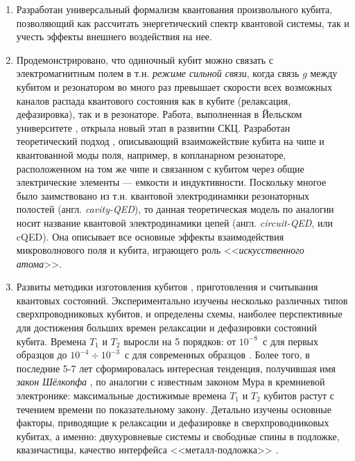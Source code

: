 \begin{enumerate}
	\item Разработан универсальный формализм \cite{devoret1995quantum} квантования произвольного кубита, позволяющий как рассчитать энергетический спектр квантовой системы, так и учесть эффекты внешнего воздействия на нее.
	\item Продемонстрировано, что одиночный кубит можно связать с электромагнитным полем в т.н. \textit{режиме сильной связи}, когда связь $g$ между кубитом и резонатором во много раз превышает скорости всех возможных каналов распада квантового состояния как в кубите (релаксация, дефазировка), так и в резонаторе. Работа, выполненная в Йельском университете \cite{wallraff2004strong}, открыла новый этап в развитии СКЦ. Разработан теоретический подход \cite{blais2004cavity}, описывающий взаиможействие кубита на чипе и квантованной моды поля, например, в копланарном резонаторе, расположенном на том же чипе и связанном с кубитом через общие электрические элементы --- емкости и индуктивности. Поскольку многое было заимствовано из т.н. квантовой электродинамики резонаторных полостей (англ. \textit{cavity-QED}), то данная теоретическая модель по аналогии носит название квантовой электродинамики цепей (англ. \textit{circuit-QED}, или cQED). Она описывает все основные эффекты взаимодействия микроволнового поля и кубита, играющего роль <<\textit{искусственного атома}>>.
	\item Развиты методики изготовления кубитов \cite{vieu2000electron,devoret2005implementing}, приготовления и считывания квантовых состояний. Экспериментально изучены несколько различных типов сверхпроводниковых кубитов, и определены схемы, наиболее перспективные для достижения больших времен релаксации и дефазировки состояний кубита. Времена $T_1$ и $T_2$ выросли на 5 порядков: от $10^{-8}$~с для первых образцов \cite{chiorescu2004coherent} до $10^{-4}\div10^{-3}$~с для современных образцов \cite{barends2014superconducting,takita2017experimental}. Более того, в последние 5-7 лет сформировалась интересная тенденция, получившая имя \textit{закон Шёлкопфа} \cite{schoelkopf2008wiring,devoret2013superconducting}, по аналогии с известным законом Мура в кремниевой электронике: максимальные достижимые времена $T_1$ и $T_2$ кубитов растут с течением времени по показательному закону. Детально изучены основные факторы, приводящие к релаксации и дефазировке в сверхпроводниковых кубитах, а именно: двухуровневые системы и свободные спины в подложке, квазичастицы, качество интерфейса <<металл-подложка>> \cite{Wenner2011surface,dunsworth2017characterization}.

\end{enumerate}
